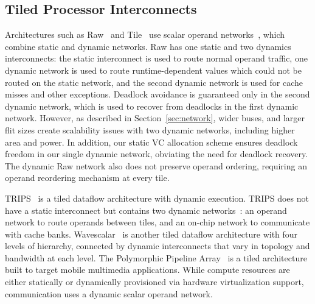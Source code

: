 \subsection{Tiled Processor Interconnects} Architectures such as Raw~\cite{raw} and Tile~\cite{tile} use scalar operand networks~\cite{son}, which combine static and dynamic networks. Raw has one static and two dynamics interconnects: the static interconnect is used to route normal operand traffic, one dynamic network is used to route runtime-dependent values which could not be routed on the static network, and the second dynamic network is used for cache misses and other exceptions. Deadlock avoidance is guaranteed only in the second dynamic network, which is used to recover from deadlocks in the first dynamic network. However, as described in Section~\ref{sec:network}, wider buses, and larger flit sizes create scalability issues with two dynamic networks, including higher area and power. In addition, our static VC allocation scheme ensures deadlock freedom in our single dynamic network, obviating the need for deadlock recovery.
The dynamic Raw network also does not preserve operand ordering, requiring an operand reordering mechanism at every tile.

TRIPS~\cite{trips} is a tiled dataflow architecture with dynamic execution. TRIPS does not have a static interconnect but contains two dynamic networks~\cite{trips-network}: an operand network to route operands between tiles, and an on-chip network to communicate with cache banks. Wavescalar~\cite{wavescalar} is another tiled dataflow architecture with four levels of hierarchy, connected by dynamic interconnects that vary in topology and bandwidth at each level. The Polymorphic Pipeline Array~\cite{ppa} is a tiled architecture built to target mobile multimedia applications. While compute resources are either statically or dynamically provisioned via hardware virtualization support, communication uses a dynamic scalar operand network.

